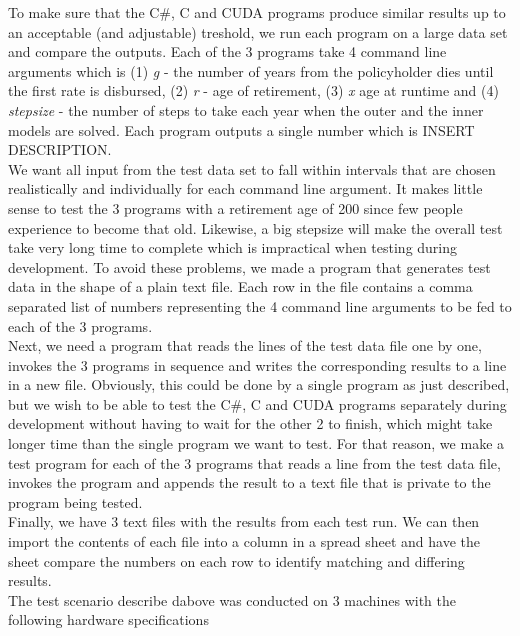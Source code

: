 To make sure that the C\#, C and CUDA programs produce similar results up to an acceptable (and adjustable) treshold, we run each program on a large data set and compare the outputs. Each of the 3 programs take 4 command line arguments which is (1) \emph{g} - the number of years from the policyholder dies until the first rate is disbursed, (2) \emph{r} -  age of retirement, (3) \emph{x} age at runtime and (4) \emph{stepsize} - the number of steps to take each year when the outer and the inner models are solved. Each program outputs a single number which is INSERT DESCRIPTION. \\

We want all input from the test data set to fall within intervals that are chosen realistically and individually for each command line argument. It makes little sense to test the 3 programs with a retirement age of 200 since few people experience to become that old. Likewise, a big stepsize will make the overall test take very long time to complete which is impractical when testing during development. To avoid these problems, we made a program that generates test data in the shape of a plain text file. Each row in the file contains a comma separated list of numbers representing the 4 command line arguments to be fed to each of the 3 programs. \\

Next, we need a program that reads the lines of the test data file one by one, invokes the 3 programs in sequence and writes the corresponding results to a line in a new file. Obviously, this could be done by a single program as just described, but we wish to be able to test the C\#, C and CUDA programs separately during development without having to wait for the other 2 to finish, which might take longer time than the single program we want to test. For that reason, we make a test program for each of the 3 programs that reads a line from the test data file, invokes the program and appends the result to a text file that is private to the program being tested. \\

Finally, we have 3 text files with the results from each test run. We can then import the contents of each file into a column in a spread sheet and have the sheet compare the numbers on each row to identify matching and differing results. \\

The test scenario describe dabove was conducted on 3 machines with the following hardware specifications

